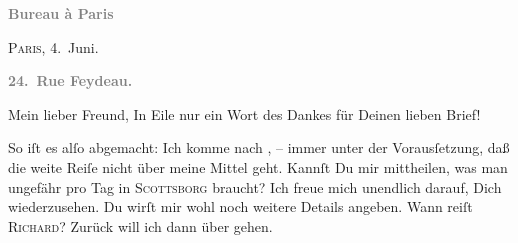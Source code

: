 \pstart
           \begin{otherlanguage}{french}\textcolor{gray}{\textbf{\textbf{Bureau à Paris}}}\end{otherlanguage}\hfill \textsc{Paris}, 4. Juni.\pend
           
\pstart
           \begin{otherlanguage}{french}\textcolor{gray}{\textbf{\textbf{24. Rue Feydeau.}}}\end{otherlanguage}\pend
           
\pstart\center{}Mein lieber Freund,\pend\vspace{0.5em}
\pstart
           In Eile nur ein Wort des Dankes für Deinen lieben Brief!\pend
           
\pstart
           So iſt es alſo abgemacht: Ich komme nach \label{K_L02776-1v}\label{K_L02776-1}, – immer unter  der Vorausſetzung, daß die
               weite Reiſe nicht über meine Mittel geht. Kannſt Du mir mittheilen, was man ungefähr
               pro Tag in \textsc{Scottsborg} braucht? {\pb}Ich freue mich unendlich darauf,
               Dich wiederzusehen. Du wirſt mir wohl noch weitere Details angeben. Wann reiſt \textsc{Richard}? Zurück will ich dann über \label{K_L02776-2v}\label{K_L02776-2} gehen.\pend
           
